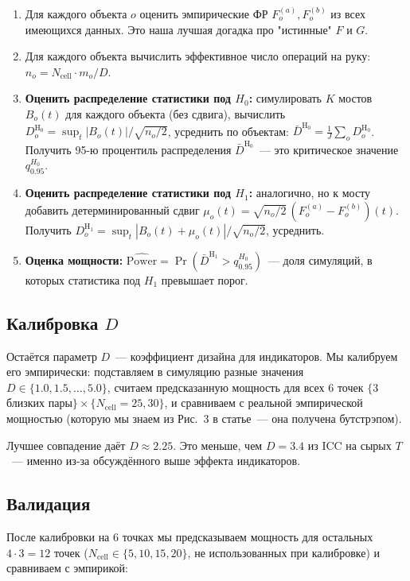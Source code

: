 \documentclass[11pt]{article}
\begin{document}
\begin{enumerate}[leftmargin=2em, itemsep=2pt]
\item Для каждого объекта $o$ оценить эмпирические ФР $F^{(a)}_o, F^{(b)}_o$ из всех имеющихся данных. Это наша лучшая догадка про "истинные" $F$ и $G$.
\item Для каждого объекта вычислить эффективное число операций на руку: $n_o = N_\text{cell} \cdot m_o / D$.
\item \textbf{Оценить распределение статистики под $H_0$:} симулировать $K$ мостов $B_o(t)$ для каждого объекта (без сдвига), вычислить $D_o^{\text{H}_0} = \sup_t |B_o(t)|/\sqrt{n_o/2}$, усреднить по объектам: $\bar D^{\text{H}_0} = \frac{1}{J}\sum_o D_o^{\text{H}_0}$. Получить 95-ю процентиль распределения $\bar D^{\text{H}_0}$~--- это критическое значение $q_{0.95}^{H_0}$.
\item \textbf{Оценить распределение статистики под $H_1$:} аналогично, но к мосту добавить детерминированный сдвиг $\mu_o(t) = \sqrt{n_o/2}\,(F^{(a)}_o - F^{(b)}_o)(t)$. Получить $D_o^{\text{H}_1} = \sup_t |B_o(t) + \mu_o(t)|/\sqrt{n_o/2}$, усреднить.
\item \textbf{Оценка мощности:} $\widehat{\text{Power}} = \Pr(\bar D^{\text{H}_1} > q_{0.95}^{H_0})$~--- доля симуляций, в которых статистика под $H_1$ превышает порог.
\end{enumerate}

\subsection{Калибровка $D$}

Остаётся параметр $D$~--- коэффициент дизайна для индикаторов. Мы калибруем его эмпирически: подставляем в симуляцию разные значения $D \in \{1.0, 1.5, \ldots, 5.0\}$, считаем предсказанную мощность для всех 6 точек $\{$3 близких пары$\} \times \{N_\text{cell} = 25, 30\}$, и сравниваем с реальной эмпирической мощностью (которую мы знаем из Рис.~3 в статье~--- она получена бутстрэпом).

Лучшее совпадение даёт $D \approx 2.25$. Это меньше, чем $D = 3.4$ из ICC на сырых $T$~--- именно из-за обсуждённого выше эффекта индикаторов.

\subsection{Валидация}

После калибровки на 6 точках мы предсказываем мощность для остальных $4 \cdot 3 = 12$ точек ($N_\text{cell} \in \{5, 10, 15, 20\}$, не использованных при калибровке) и сравниваем с эмпирикой:
\end{document}
